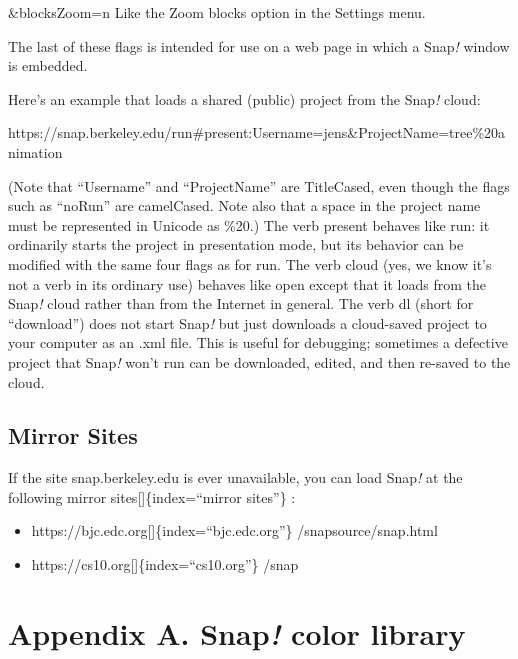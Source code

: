 \documentclass[
  letterpaper,
]{book}
\begin{document}
\&blocksZoom=n Like the Zoom blocks option in the Settings menu.

The last of these flags is intended for use on a web page in which a
Snap\emph{!} window is embedded.

Here's an example that loads a shared (public) project from the
Snap\emph{!} cloud:

https://snap.berkeley.edu/run\#present:Username=jens\&ProjectName=tree\%20animation

(Note that ``Username'' and ``ProjectName'' are TitleCased, even though
the flags such as ``noRun'' are camelCased. Note also that a space in
the project name must be represented in Unicode as \%20.) The verb
present behaves like run: it ordinarily starts the project in
presentation mode, but its behavior can be modified with the same four
flags as for run. The verb cloud (yes, we know it's not a verb in its
ordinary use) behaves like open except that it loads from the
Snap\emph{!} cloud rather than from the Internet in general. The verb dl
(short for ``download'') does not start Snap\emph{!} but just downloads
a cloud-saved project to your computer as an .xml file. This is useful
for debugging; sometimes a defective project that Snap\emph{!} won't run
can be downloaded, edited, and then re-saved to the cloud.

\section{Mirror Sites}\label{mirror-sites}

If the site snap.berkeley.edu is ever unavailable, you can load
Snap\emph{!} at the following mirror sites{[}{]}\{index=``mirror
sites''\} :

\begin{itemize}
\item
  https://bjc.edc.org{[}{]}\{index=``bjc.edc.org''\}
  /snapsource/snap.html
\item
  https://cs10.org{[}{]}\{index=``cs10.org''\} /snap
\end{itemize}

\cleardoublepage
{}
{}
\appendix

\chapter{\texorpdfstring{Appendix A. Snap\emph{!} color
library}{Appendix A. Snap! color library}}\label{appendix-a.-snap-color-library}
\end{document}
